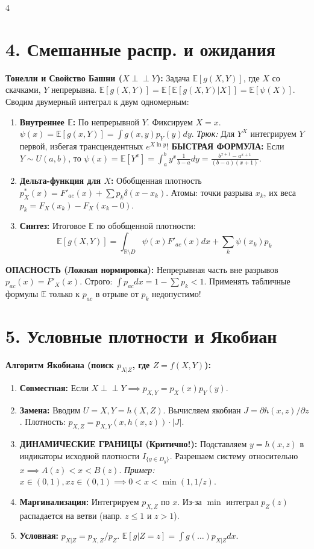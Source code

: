 \documentclass[a4paper, landscape]{article}
\newcommand{\E}{\mathbb{E}}
\begin{document}
\begin{multicols*}{4}
\section*{4. Смешанные распр. и ожидания}
\textbf{Тонелли и Свойство Башни ($X \perp\!\!\perp Y$):} Задача $\E[g(X,Y)]$, где $X$ со скачками, $Y$ непрерывна. $\E[g(X,Y)] = \E[\E[g(X,Y)|X]] = \E[\psi(X)]$. Сводим двумерный интеграл к двум одномерным:
\begin{enumerate}
    \item \textbf{Внутреннее $\E$:} По непрерывной $Y$. Фиксируем $X=x$. $\psi(x) = \E[g(x,Y)] = \int g(x,y)p_Y(y)dy$. \textit{Трюк:} Для $Y^X$ интегрируем $Y$ первой, избегая трансцендентных $e^{X\ln y}$!
    \textbf{БЫСТРАЯ ФОРМУЛА:} Если $Y \!\sim\! U(a,b)$, то $\psi(x) = \E[Y^x] = \int_a^b y^x \frac{1}{b-a} dy = \frac{b^{x+1}-a^{x+1}}{(b-a)(x+1)}$.
    \item \textbf{Дельта-функция для $X$:} Обобщенная плотность $p_X^*(x) = F'_{ac}(x) + \sum p_k \delta(x-x_k)$. Атомы: точки разрыва $x_k$, их веса $p_k = F_X(x_k) - F_X(x_k-0)$.
    \item \textbf{Синтез:} Итоговое $\E$ по обобщенной плотности:
    $$ \E[g(X,Y)] = \int_{\mathbb{R}\setminus D} \psi(x) F'_{ac}(x) dx + \sum_{k} \psi(x_k) p_k $$
\end{enumerate}
\textbf{ОПАСНОСТЬ (Ложная нормировка):} Непрерывная часть вне разрывов $p_{ac}(x) = F'_X(x)$. Строго: $\int p_{ac}dx = 1 - \sum p_k < 1$. Применять табличные формулы $\E$ только к $p_{ac}$ в отрыве от $p_k$ недопустимо!

\section*{5. Условные плотности и Якобиан}
\textbf{Алгоритм Якобиана (поиск $p_{X|Z}$, где $Z=f(X,Y)$):}
\begin{enumerate}
    \item \textbf{Совместная:} Если $X \perp\!\!\perp Y \implies p_{X,Y} = p_X(x)p_Y(y)$.
    \item \textbf{Замена:} Вводим $U\!=\!X, Y\!=\!h(X,Z)$. Вычисляем якобиан $J = \partial h(x,z) / \partial z$. Плотность: $p_{X,Z} = p_{X,Y}(x, h(x,z)) \cdot |J|$.
    \item \textbf{ДИНАМИЧЕСКИЕ ГРАНИЦЫ (Критично!):} Подставляем $y=h(x,z)$ в индикаторы исходной плотности $I_{\{y \in D_y\}}$. Разрешаем систему относительно $x \implies A(z) < x < B(z)$.
    \textit{Пример:} $x \!\in\! (0,1), xz \!\in\! (0,1) \implies 0 < x < \min(1, 1/z)$.
    \item \textbf{Маргинализация:} Интегрируем $p_{X,Z}$ по $x$. Из-за $\min$ интеграл $p_Z(z)$ распадается на ветви (напр. $z \le 1$ и $z > 1$).
    \item \textbf{Условная:} $p_{X|Z} \!=\! p_{X,Z}/p_Z$. $\E[g|Z=z] \!=\! \int g(\dots) p_{X|Z}dx$.
\end{enumerate}


\end{multicols*}
\end{document}
